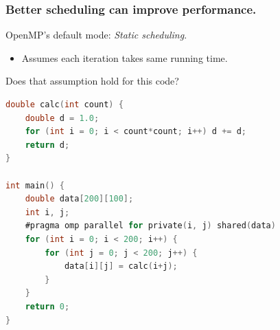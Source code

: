 \begin{frame}[fragile]
  \frametitle{Better scheduling can improve performance.}

  
  \begin{changemargin}{2cm}
    \large
  OpenMP's default mode: \emph{Static scheduling}.
  \begin{itemize}
    \item Assumes each iteration takes same running time.
  \end{itemize}

  Does that assumption hold for this code?

  \begin{lstlisting}[language=C,morekeywords={foreach,pragma,omp,parallel,single,nowait,task,untied,barrier,taskyield}]
double calc(int count) {
    double d = 1.0;
    for (int i = 0; i < count*count; i++) d += d;
    return d;
}

int main() {
    double data[200][100];
    int i, j;
    #pragma omp parallel for private(i, j) shared(data)
    for (int i = 0; i < 200; i++) {
        for (int j = 0; j < 200; j++) {
            data[i][j] = calc(i+j);
        }
    }
    return 0;
}
  \end{lstlisting}
  \end{changemargin}

\end{frame}

